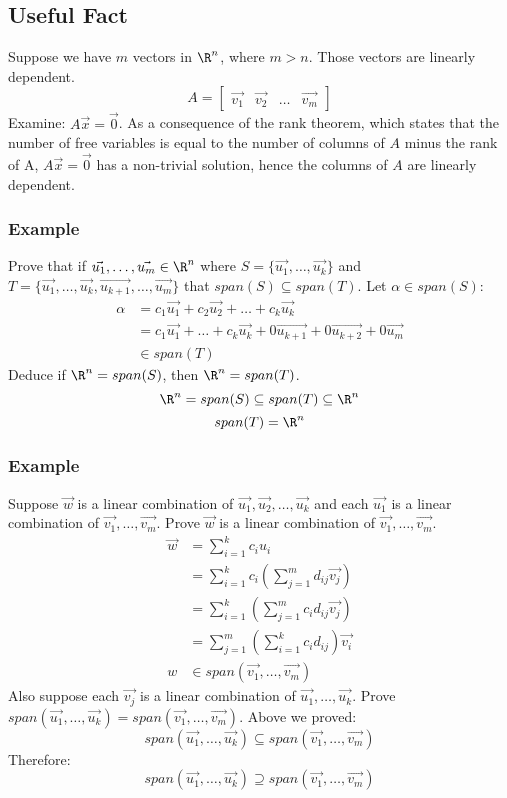 \documentclass{math}
\begin{document}
\subsection*{Useful Fact}
Suppose we have \( m \) vectors in \( \R^n \), where \( m > n \). Those vectors
are linearly dependent.
\[ A = \begin{bmatrix}\vec{v_1} & \vec{v_2} & \dots & \vec{v_m}\end{bmatrix} \]
Examine: \( A\vec{x} = \vec{0} \). As a consequence of the rank theorem, which
states that the number of free variables is equal to the number of columns of
\( A \) minus the rank of A, \( A\vec{x} = \vec{0} \) has a non-trivial
solution, hence the columns of \( A \) are linearly dependent.

\subsubsection*{Example}
Prove that if \( \vec{u_1},\dots,\vec{u_m}\in\R^n \) where \( S = \{\vec{u_1},
\dots,\vec{u_k}\} \) and \( T = \{\vec{u_1},\dots,\vec{u_k},\vec{u_{k+1}},\dots,
\vec{u_m}\} \) that \( span(S)\subseteq span(T) \).
Let \( \alpha\in span(S) \):
\begin{align*}
  \alpha &= c_1\vec{u_1}+c_2\vec{u_2}+\dots+c_k\vec{u_k} \\
  &= c_1\vec{u_1}+\dots+c_k\vec{u_k}+0\vec{u_{k+1}}+0\vec{u_{k+2}}+0\vec{u_m} \\
  &\in span(T)
\end{align*}
Deduce if \( \R^n = span(S) \), then \( \R^n = span(T) \).
\[ \R^n = span(S) \subseteq span(T) \subseteq \R^n \]
\[ span(T) = \R^n \]

\subsubsection*{Example}
Suppose \( \vec{w} \) is a linear combination of \( \vec{u_1},\vec{u_2},\dots,
\vec{u_k} \) and each \( \vec{u_1} \) is a linear combination of \( \vec{v_1},
\dots,\vec{v_m} \). Prove \( \vec{w} \) is a linear combination of \( \vec{v_1},
\dots,\vec{v_m} \).
\begin{align*}
  \vec{w} &= \sum_{i=1}^{k}c_iu_i \\
  &= \sum_{i=1}^{k}c_i\left(\sum_{j=1}^{m}d_{ij}\vec{v_j}\right) \\
  &= \sum_{i=1}^{k}\left(\sum_{j=1}^{m}c_id_{ij}\vec{v_j}\right) \\
  &= \sum_{j=1}^{m}\left(\sum_{i=1}^{k}c_id_{ij}\right)\vec{v_i} \\
  w &\in span(\vec{v_1},\dots,\vec{v_m})
\end{align*}
Also suppose each \( \vec{v_j} \) is a linear combination of \( \vec{u_1},\dots,
\vec{u_k} \). Prove \( span(\vec{u_1},\dots,\vec{u_k}) =
span(\vec{v_1},\dots,\vec{v_m}) \). Above we proved:
\[ span(\vec{u_1},\dots,\vec{u_k}) \subseteq span(\vec{v_1},\dots,\vec{v_m}) \]
Therefore:
\[ span(\vec{u_1},\dots,\vec{u_k}) \supseteq span(\vec{v_1},\dots,\vec{v_m}) \]
\end{document}

